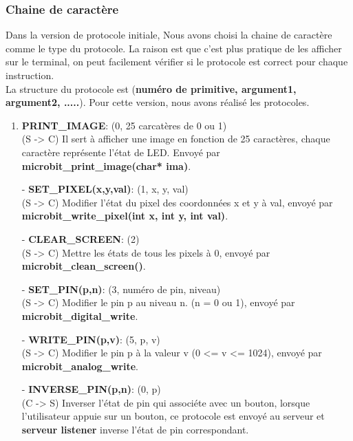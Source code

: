 \documentclass[14px]{article}
\begin{document}
\subsubsection{Chaine de caractère}
Dans la version de protocole initiale, Nous avons choisi la chaine de caractère comme le type du protocole. La raison est que c'est plus pratique de les afficher sur le terminal, on peut facilement vérifier si le protocole est correct pour chaque instruction. \\
La structure du protocole est (\textbf{numéro de primitive, argument1, argument2, .....}).
Pour cette version, nous avons réalisé les protocoles.
\begin{enumerate}
	\item \textbf{PRINT\_IMAGE}: (0, 25 carcatères de 0 ou 1)\\
	(S -> C) Il sert à afficher une image en fonction de 25 caractères, chaque caractère représente l'état de LED. Envoyé par \textbf{microbit\_print\_image(char* ima)}.
	\item[-] \textbf{SET\_PIXEL(x,y,val)}: (1, x, y, val)\\
	(S -> C) Modifier l'état du pixel des coordonnées x et y à val, envoyé par \textbf{microbit\_write\_pixel(int x, int y, int val)}.
	\item[-] \textbf{CLEAR\_SCREEN}: (2)\\
	(S -> C) Mettre les états de tous les pixels à 0, envoyé par \textbf{microbit\_clean\_screen()}.
	\item[-] \textbf{SET\_PIN(p,n)}: (3, numéro de pin, niveau)\\
	(S -> C) Modifier le pin p au niveau n. (n = 0 ou 1), envoyé par \textbf{microbit\_digital\_write}.
	\item[-] \textbf{WRITE\_PIN(p,v)}: (5, p, v)\\
	(S -> C) Modifier le pin p à la valeur v (0 <= v <= 1024), envoyé par \textbf{microbit\_analog\_write}.\\

	\item[-] \textbf{INVERSE\_PIN(p,n)}: (0, p)\\
	(C -> S) Inverser l'état de pin qui associéte avec un bouton, lorsque l'utilisateur appuie sur un bouton, ce protocole est envoyé au serveur et \textbf{serveur listener} inverse l'état de pin correspondant.
\end{enumerate}
\end{document}
